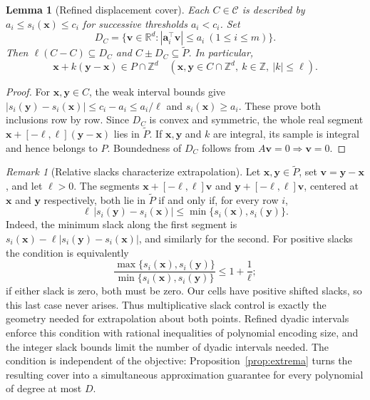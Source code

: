 \documentclass[11pt]{article}
\newtheorem{lemma}[theorem]{Lemma}
\theoremstyle{definition}\newtheorem{definition}{Definition}[section]
\theoremstyle{remark}\newtheorem{remark}[theorem]{Remark}
\newcommand{\R}{\mathbb R}\newcommand{\Q}{\mathbb Q}\newcommand{\Z}{\mathbb Z}
\begin{document}
\begin{lemma}[Refined displacement cover]\label{lem:reflection}
Each $C\in\mathcal C$ is described by $a_i\le s_i(\mathbf{x})\le c_i$ for successive thresholds $a_i<c_i$. Set
\[
 D_C=\{\mathbf v\in\R^d:|\mathbf a_i^\top\mathbf v|\le a_i\ (1\le i\le m)\}.
\]
Then $\ell(C-C)\subseteq D_C$ and $C\pm D_C\subseteq\widetilde P$. In particular,
\begin{equation}\label{eq:long}
 \mathbf{x}+k(\mathbf{y}-\mathbf{x})\in P\cap\Z^d
 \quad(\mathbf{x},\mathbf y\in C\cap\Z^d,\ k\in\Z,\ |k|\le\ell).
\end{equation}
\end{lemma}
\begin{proof}
For $\mathbf{x},\mathbf y\in C$, the weak interval bounds give
$|s_i(\mathbf y)-s_i(\mathbf{x})|\le c_i-a_i\le a_i/\ell$ and $s_i(\mathbf{x})\ge a_i$. These prove both inclusions row by row. Since $D_C$ is convex and symmetric, the whole real segment $\mathbf{x}+[-\ell,\ell](\mathbf y-\mathbf{x})$ lies in $\widetilde P$. If $\mathbf{x},\mathbf y$ and $k$ are integral, its sample is integral and hence belongs to $P$. Boundedness of $D_C$ follows from $A\mathbf v=0\Rightarrow\mathbf v=0$.
\end{proof}

\begin{remark}[Relative slacks characterize extrapolation]\label{rem:slack-characterization}
Let $\mathbf{x},\mathbf y\in\widetilde P$, set $\mathbf v=\mathbf y-\mathbf{x}$, and let $\ell>0$. The segments $\mathbf{x}+[-\ell,\ell]\mathbf v$ and $\mathbf y+[-\ell,\ell]\mathbf v$, centered at $\mathbf{x}$ and $\mathbf y$ respectively, both lie in $\widetilde P$ if and only if, for every row $i$,
\[
 \ell\,|s_i(\mathbf y)-s_i(\mathbf{x})|
 \le\min\{s_i(\mathbf{x}),s_i(\mathbf y)\}.
\]
Indeed, the minimum slack along the first segment is $s_i(\mathbf{x})-\ell|s_i(\mathbf y)-s_i(\mathbf{x})|$, and similarly for the second. For positive slacks the condition is equivalently
\[
 \frac{\max\{s_i(\mathbf{x}),s_i(\mathbf y)\}}
 {\min\{s_i(\mathbf{x}),s_i(\mathbf y)\}}\le1+\frac1\ell;
\]
if either slack is zero, both must be zero. Our cells have positive shifted slacks, so this last case never arises. Thus multiplicative slack control is exactly the geometry needed for extrapolation about both points. Refined dyadic intervals enforce this condition with rational inequalities of polynomial encoding size, and the integer slack bounds limit the number of dyadic intervals needed. The condition is independent of the objective: Proposition~\ref{prop:extrema} turns the resulting cover into a simultaneous approximation guarantee for every polynomial of degree at most $D$.
\end{remark}
\end{document}
